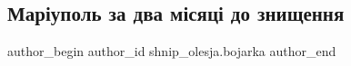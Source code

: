  
 
 
 
 

\subsection{Маріуполь за два місяці до знищення}
\label{sec:02_12_2022.fb.shnip_olesja.bojarka.1.mar_upol_za_dva_m_sy}

\ifcmt
 author_begin
   author_id shnip_olesja.bojarka
 author_end
\fi
